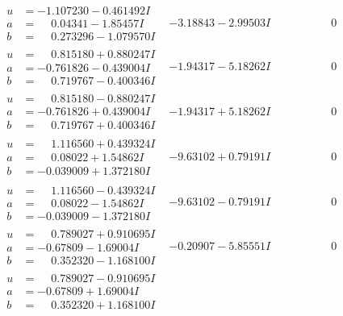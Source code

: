 \documentclass[1p]{elsarticle_modified}
\theoremstyle{definition}
\begin{document}
$$\begin{array}{c|c|c}
\begin{aligned}
u &= -1.107230 - 0.461492 I \\
a &= \phantom{-}0.04341 - 1.85457 I \\
b &= \phantom{-}0.273296 - 1.079570 I\end{aligned}
 & -3.18843 - 2.99503 I & \phantom{-0.000000 } 0 \\ \hline\begin{aligned}
u &= \phantom{-}0.815180 + 0.880247 I \\
a &= -0.761826 - 0.439004 I \\
b &= \phantom{-}0.719767 - 0.400346 I\end{aligned}
 & -1.94317 - 5.18262 I & \phantom{-0.000000 } 0 \\ \hline\begin{aligned}
u &= \phantom{-}0.815180 - 0.880247 I \\
a &= -0.761826 + 0.439004 I \\
b &= \phantom{-}0.719767 + 0.400346 I\end{aligned}
 & -1.94317 + 5.18262 I & \phantom{-0.000000 } 0 \\ \hline\begin{aligned}
u &= \phantom{-}1.116560 + 0.439324 I \\
a &= \phantom{-}0.08022 + 1.54862 I \\
b &= -0.039009 + 1.372180 I\end{aligned}
 & -9.63102 + 0.79191 I & \phantom{-0.000000 } 0 \\ \hline\begin{aligned}
u &= \phantom{-}1.116560 - 0.439324 I \\
a &= \phantom{-}0.08022 - 1.54862 I \\
b &= -0.039009 - 1.372180 I\end{aligned}
 & -9.63102 - 0.79191 I & \phantom{-0.000000 } 0 \\ \hline\begin{aligned}
u &= \phantom{-}0.789027 + 0.910695 I \\
a &= -0.67809 - 1.69004 I \\
b &= \phantom{-}0.352320 - 1.168100 I\end{aligned}
 & -0.20907 - 5.85551 I & \phantom{-0.000000 } 0 \\ \hline\begin{aligned}
u &= \phantom{-}0.789027 - 0.910695 I \\
a &= -0.67809 + 1.69004 I \\
b &= \phantom{-}0.352320 + 1.168100 I\end{aligned}

\end{array}$$
\end{document}
